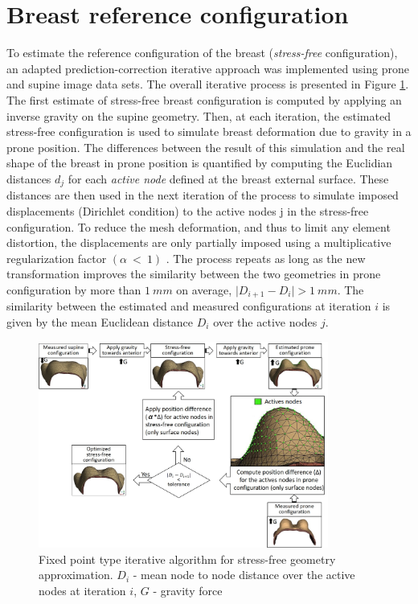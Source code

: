\section{Breast reference configuration}\label{section:myStressFree}
To estimate the reference configuration of the breast (\textit{stress-free} configuration), an adapted prediction-correction iterative approach was implemented \citep{eiben_breast_2014} using prone and supine image data sets. The overall iterative process is presented in Figure \ref{fig:myfixedpointalgo}. The first estimate of stress-free breast configuration is computed by applying an inverse gravity on the supine geometry. Then, at each iteration, the estimated stress-free configuration is used to simulate breast deformation due to gravity in a prone position. The differences between the result of this simulation and the real shape of the breast in prone position is quantified by computing the Euclidian distances $d_j$ for each \textit{active node} defined at the breast external surface. These distances are then used in the next iteration of the process to simulate imposed displacements (Dirichlet condition) to the active nodes j in the stress-free configuration. To reduce the mesh deformation, and thus to limit any element distortion, the displacements are only partially imposed using a multiplicative regularization factor $ (\alpha\ <\ 1)$ . The process repeats as long as the new transformation improves the similarity between the two geometries in prone configuration by more than $1\ mm$ on average, $\vert D_{i+1}-D_i \vert > 1\ mm$. The similarity between the estimated and measured configurations at iteration $i$ is given by the mean Euclidean distance $D_i$ over the active nodes $j$.                                                              

\begin{figure}[!h]
\centering
\includegraphics[width=0.85\textwidth,keepaspectratio]{figures/stress_free_config_algo.jpg} 
\caption{Fixed point type iterative algorithm for stress-free geometry approximation. $D_i$ - mean node to node distance over the active nodes at iteration $i$, $G$ - gravity force}\label{fig:myfixedpointalgo}
\end{figure}

